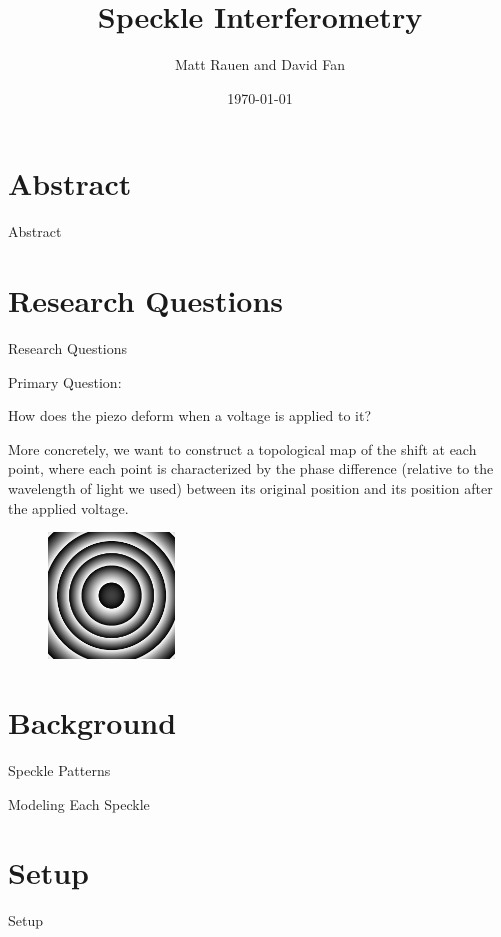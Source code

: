 \documentclass[pdf]{beamer}
\title{Speckle Interferometry}
\author{Matt Rauen and David Fan}
\date{\today}
\begin{document}
\begin{frame}
\titlepage
\end{frame}

\section{Abstract}
\begin{frame}{Abstract}

\end{frame}

\section{Research Questions}
\begin{frame}{Research Questions}
\begin{center}
Primary Question:

How does the piezo deform when a voltage is applied to it?
\end{center}
More concretely, we want to construct a topological map of the shift at each point, where each point is characterized by the phase difference (relative to the wavelength of light we used) between its original position and its position after the applied voltage.
\begin{figure}[htbp]
\centering
\includegraphics[width=0.3\textwidth]{gaussian_bump.png}
\end{figure}
\end{frame}

\section{Background}
\begin{frame}{Speckle Patterns}

\end{frame}

\begin{frame}{Modeling Each Speckle}

\end{frame}

\section{Setup}
\begin{frame}{Setup}

\end{frame}
\end{document}
